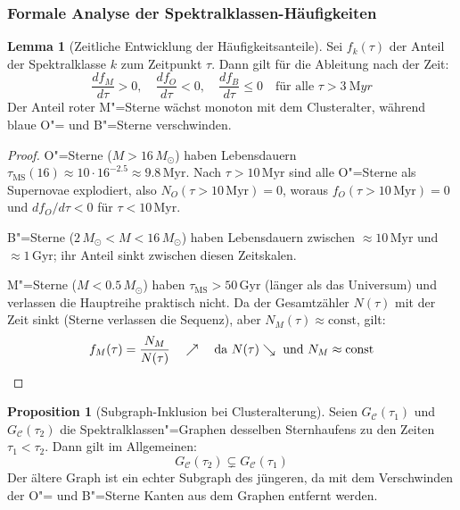 ﻿\documentclass[a4paper,12pt]{article}
\theoremstyle{definition}
\newtheorem{lemma}{Lemma}
\newtheorem{proposition}{Proposition}
\begin{document}
\subsubsection{Formale Analyse der Spektralklassen-Häufigkeiten}

\begin{lemma}[Zeitliche Entwicklung der Häufigkeitsanteile]
\label{lem:frakevol}
    Sei $f_k(\tau)$ der Anteil der Spektralklasse $k$ zum Zeitpunkt $\tau$.
    Dann gilt für die Ableitung nach der Zeit:
    \[
        \frac{df_M}{d\tau} > 0, \quad
        \frac{df_O}{d\tau} < 0, \quad
        \frac{df_B}{d\tau} \leq 0
        \quad \text{für alle } \tau > \SI{3}{\mega yr}
    \]
    Der Anteil roter M"=Sterne wächst monoton mit dem Clusteralter,
    während blaue O"= und B"=Sterne verschwinden.
\end{lemma}

\begin{proof}
    O"=Sterne ($M > 16\,M_\odot$) haben Lebensdauern
    $\tau_{\text{MS}}(16) \approx 10 \cdot 16^{-2.5} \approx 9.8\,\text{Myr}$.
    Nach $\tau > 10\,\text{Myr}$ sind alle O"=Sterne als Supernovae
    explodiert, also $N_O(\tau > 10\,\text{Myr}) = 0$, woraus
    $f_O(\tau > 10\,\text{Myr}) = 0$ und $df_O/d\tau < 0$
    für $\tau < 10\,\text{Myr}$.

    B"=Sterne ($2\,M_\odot < M < 16\,M_\odot$) haben Lebensdauern
    zwischen $\approx 10\,\text{Myr}$ und $\approx 1\,\text{Gyr}$;
    ihr Anteil sinkt zwischen diesen Zeitskalen.

    M"=Sterne ($M < 0.5\,M_\odot$) haben $\tau_{\text{MS}} > 50\,\text{Gyr}$
    (länger als das Universum) und verlassen die Hauptreihe praktisch nicht.
    Da der Gesamtzähler $N(\tau)$ mit der Zeit sinkt (Sterne verlassen
    die Sequenz), aber $N_M(\tau) \approx \text{const}$, gilt:
    \[
        f_M(\tau) = \frac{N_M}{N(\tau)} \quad \nearrow \quad
        \text{da } N(\tau) \searrow \text{ und } N_M \approx \text{const} \qedhere
    \]
\end{proof}

\begin{proposition}[Subgraph-Inklusion bei Clusteralterung]
\label{prop:inklusion}
    Seien $G_{\mathcal{C}}(\tau_1)$ und $G_{\mathcal{C}}(\tau_2)$ die
    Spektralklassen"=Graphen desselben Sternhaufens zu den Zeiten
    $\tau_1 < \tau_2$. Dann gilt im Allgemeinen:
    \[
        G_{\mathcal{C}}(\tau_2) \subsetneq G_{\mathcal{C}}(\tau_1)
    \]
    Der ältere Graph ist ein echter Subgraph des jüngeren, da mit dem
    Verschwinden der O"= und B"=Sterne Kanten aus dem Graphen entfernt werden.
\end{proposition}
\end{document}
